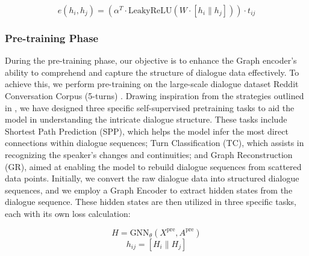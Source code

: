 \begin{equation}\label{eq:dialoguegat_turn_act}
    e(h_i, h_j) = (\alpha^T \cdot \text{LeakyReLU}(W \cdot [h_i \parallel h_j])) \cdot t_{ij}
\end{equation}


\subsubsection{Pre-training Phase}
During the pre-training phase, our objective is to enhance the Graph encoder's ability to comprehend and capture the structure of dialogue data effectively. To achieve this, we perform pre-training on the large-scale dialogue dataset Reddit Conversation Corpus (5-turns) \cite{dziri-etal-2019-augmenting}. Drawing inspiration from the strategies outlined in \cite{wu-etal-2023-gnn-pretrain}, we have designed three specific self-supervised pretraining tasks to aid the model in understanding the intricate dialogue structure. These tasks include Shortest Path Prediction (SPP), which helps the model infer the most direct connections within dialogue sequences; Turn Classification (TC), which assists in recognizing the speaker's changes and continuities; and Graph Reconstruction (GR), aimed at enabling the model to rebuild dialogue sequences from scattered data points. Initially, we convert the raw dialogue data into structured dialogue sequences, and we employ a Graph Encoder to extract hidden states from the dialogue sequence. These hidden states are then utilized in three specific tasks, each with its own loss calculation:

\begin{equation}\label{eq:gnn_pre_enc}
    H = \text{GNN}_{\theta}(X^{\text{pre}},A^{\text{pre}})
\end{equation}
\begin{equation}\label{eq:gnn_pre_concat}
    h_{ij} = [H_i \parallel H_j]
\end{equation}


